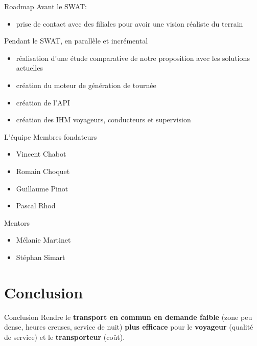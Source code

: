 \documentclass[table]{beamer}
\begin{document}
\begin{frame}{Roadmap}
  Avant le SWAT:
  \begin{itemize}
  \item prise de contact avec des filiales pour avoir une vision
    réaliste du terrain
  \end{itemize}

  Pendant le SWAT, en parallèle et incrémental
  \begin{itemize}
  \item réalisation d'une étude comparative de notre proposition avec
    les solutions actuelles
  \item création du moteur de génération de tournée
  \item création de l'API
  \item création des IHM voyageurs, conducteurs et supervision
  \end{itemize}
\end{frame}

\begin{frame}{L'équipe}
  Membres fondateurs
  \begin{itemize}
  \item Vincent Chabot
  \item Romain Choquet
  \item Guillaume Pinot
  \item Pascal Rhod
  \end{itemize}

  Mentors
  \begin{itemize}
  \item Mélanie Martinet
  \item Stéphan Simart
  \end{itemize}
\end{frame}


\section{Conclusion}

\begin{frame}{Conclusion}
  Rendre le \textbf{transport en commun en demande faible} (zone peu
  dense, heures creuses, service de nuit) \textbf{plus efficace} pour
  le \textbf{voyageur} (qualité de service) et le
  \textbf{transporteur} (coût).
\end{frame}

\begin{frame}
  \titlepage
\end{frame}
\end{document}
